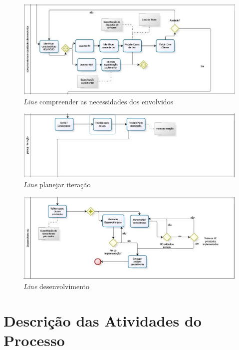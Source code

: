 \begin{figure}[htb]
\centering
  \includegraphics[keepaspectratio=true,scale=0.6]
  {figuras/compreender.eps}
  \caption{\textit{Line} compreender as necessidades dos envolvidos}
  \label{comprehend}
\end{figure}

\begin{figure}[htb]
\centering
  \includegraphics[keepaspectratio=true,scale=0.6]
  {figuras/planejar.eps}
  \caption{\textit{Line} planejar iteração}
  \label{planning}
\end{figure}

\begin{figure}[htb]
\centering
  \includegraphics[keepaspectratio=true,scale=0.6]
  {figuras/desenvolvimento.eps}
  \caption{\textit{Line} desenvolvimento}
  \label{devel}
\end{figure}

\clearpage{}

\section{Descrição das Atividades do Processo}

